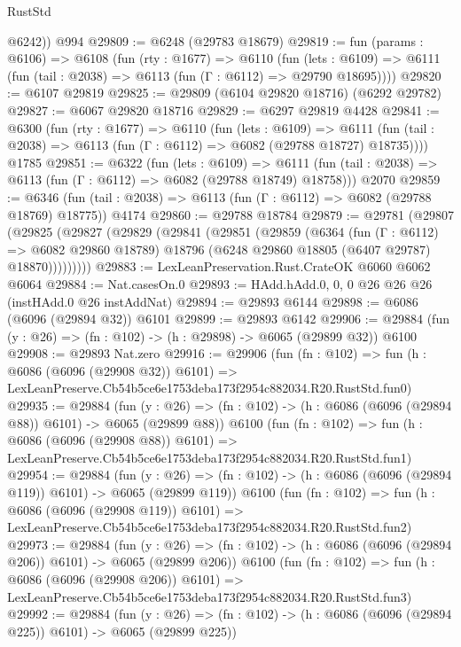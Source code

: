 \begin{lexlean}{RustStd}
\begin{coremodule}
        @6242))
    @994
@29809 := @6248 (@29783 @18679)
@29819 := fun (params : @6106) =>
  @6108
    (fun (rty : @1677) =>
    @6110
      (fun (lets : @6109) =>
      @6111 (fun (tail : @2038) => @6113 (fun (Γ : @6112) => @29790 @18695))))
@29820 := @6107 @29819
@29825 := @29809 (@6104 @29820 @18716) (@6292 @29782)
@29827 := @6067 @29820 @18716
@29829 := @6297 @29819 @4428
@29841 := @6300
    (fun (rty : @1677) =>
    @6110
      (fun (lets : @6109) =>
      @6111 (fun (tail : @2038) => @6113 (fun (Γ : @6112) => @6082 (@29788 @18727) @18735))))
    @1785
@29851 := @6322
    (fun (lets : @6109) =>
    @6111 (fun (tail : @2038) => @6113 (fun (Γ : @6112) => @6082 (@29788 @18749) @18758)))
    @2070
@29859 := @6346
    (fun (tail : @2038) => @6113 (fun (Γ : @6112) => @6082 (@29788 @18769) @18775))
    @4174
@29860 := @29788 @18784
@29879 := @29781
    (@29807
      (@29825
        (@29827
          (@29829
            (@29841
              (@29851
                (@29859
                  (@6364
                    (fun (Γ : @6112) => @6082 @29860 @18789)
                    @18796
                    (@6248 @29860 @18805 (@6407 @29787) @18870)))))))))
@29883 := LexLeanPreservation.Rust.CrateOK @6060 @6062 @6064
@29884 := Nat.casesOn.{0}
@29893 := HAdd.hAdd.{0, 0, 0} @26 @26 @26 (instHAdd.{0} @26 instAddNat)
@29894 := @29893 @6144
@29898 := @6086 (@6096 (@29894 @32)) @6101
@29899 := @29893 @6142
@29906 := @29884 (fun (y : @26) => (fn : @102) -> (h : @29898) -> @6065 (@29899 @32)) @6100
@29908 := @29893 Nat.zero
@29916 := @29906
    (fun (fn : @102) =>
    fun (h : @6086 (@6096 (@29908 @32)) @6101) =>
    LexLeanPreserve.Cb54b5ce6e1753deba173f2954c882034.R20.RustStd.fun0)
@29935 := @29884
    (fun (y : @26) => (fn : @102) -> (h : @6086 (@6096 (@29894 @88)) @6101) -> @6065 (@29899 @88))
    @6100
    (fun (fn : @102) =>
    fun (h : @6086 (@6096 (@29908 @88)) @6101) =>
    LexLeanPreserve.Cb54b5ce6e1753deba173f2954c882034.R20.RustStd.fun1)
@29954 := @29884
    (fun (y : @26) => (fn : @102) -> (h : @6086 (@6096 (@29894 @119)) @6101) -> @6065 (@29899 @119))
    @6100
    (fun (fn : @102) =>
    fun (h : @6086 (@6096 (@29908 @119)) @6101) =>
    LexLeanPreserve.Cb54b5ce6e1753deba173f2954c882034.R20.RustStd.fun2)
@29973 := @29884
    (fun (y : @26) => (fn : @102) -> (h : @6086 (@6096 (@29894 @206)) @6101) -> @6065 (@29899 @206))
    @6100
    (fun (fn : @102) =>
    fun (h : @6086 (@6096 (@29908 @206)) @6101) =>
    LexLeanPreserve.Cb54b5ce6e1753deba173f2954c882034.R20.RustStd.fun3)
@29992 := @29884
    (fun (y : @26) => (fn : @102) -> (h : @6086 (@6096 (@29894 @225)) @6101) -> @6065 (@29899 @225))

\end{coremodule}
\end{lexlean}
